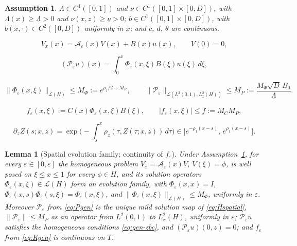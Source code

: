 \documentclass[10pt,a4paper]{amsart}
\newtheorem{assumption}{Assumption}
\newtheorem{lemma}{Lemma}
\newcommand{\Hs}{H}
\newcommand{\PP}{\mathcal P}
\newcommand{\uL}{\underline\Lambda}
\newcommand{\un}{\underline\nu}
\begin{document}
\begin{assumption}\label{as:coeff}
$\Lambda\in C^1([0,1])$ and $\nu\in C^1([0,1]\times[0,D])$, with $\Lambda(x)\ge\uL>0$ and $\nu(x,z)\ge\un>0$; $b\in C^1([0,1]\times[0,D])$, with $b(x,\cdot)\in C^2([0,D])$ uniformly in $x$; and $c$, $d$, $\theta$ are continuous.
\end{assumption}

\begin{equation}
 V_x(x)=\mathcal A_\varepsilon(x)V(x)+B(x)u(x),\qquad V(0)=0,
 \label{eq:Hspatial}
\end{equation}

\begin{equation}
 (\PP_\varepsilon u)(x)=\int_0^x\Phi_\varepsilon(x,\xi)B(\xi)u(\xi)\,d\xi ,
 \label{eq:Pgen}
\end{equation}

\begin{equation}
 \|\Phi_\varepsilon(x,\xi)\|_{\mathcal L(\Hs)}\le M_\Phi:=e^{\rho_1/2+M_R},
 \qquad
 \|\PP_\varepsilon\|_{\mathcal L(L^2(0,1),L^2_x(\Hs))}\le M_P:=\frac{M_\Phi\sqrt D\,B_0}{\uL} .
 \label{eq:Phibound}
\end{equation}

\begin{equation}
 f_\varepsilon(x,\xi):=C(x)\Phi_\varepsilon(x,\xi)B(\xi),
 \qquad
 |f_\varepsilon(x,\xi)|\le\bar f:=M_CM_P,
 \label{eq:Kgen}
\end{equation}

\begin{equation}
 \partial_z Z(s;x,z)
 =\exp\!\Big(-\!\int_s^x\rho_z(\tau,Z(\tau;x,z))\,d\tau\Big)
 \in\big[e^{-\rho_1(x-s)},\,e^{\rho_1(x-s)}\big].
 \label{eq:charJac}
\end{equation}

\begin{lemma}[Spatial evolution family; continuity of $f_\varepsilon$]\label{lem:evolution}
Under Assumption~\ref{as:coeff}, for every $\varepsilon\in[0,\bar\varepsilon]$ the homogeneous problem $V_x=\mathcal A_\varepsilon(x)V$, $V(\xi)=\phi$, is well posed on $\xi\le x\le1$ for every $\phi\in\Hs$, and its solution operators $\Phi_\varepsilon(x,\xi)\in\mathcal L(\Hs)$ form an evolution family, with $\Phi_\varepsilon(x,x)=I$, $\Phi_\varepsilon(x,s)\Phi_\varepsilon(s,\xi)=\Phi_\varepsilon(x,\xi)$, and $\|\Phi_\varepsilon(x,\xi)\|_{\mathcal L(\Hs)}\le M_\Phi$, uniformly in $\varepsilon$. Moreover $\PP_\varepsilon$ from \eqref{eq:Pgen} is the unique mild solution map of \eqref{eq:Hspatial}, $\|\PP_\varepsilon\|\le M_P$ as an operator from $L^2(0,1)$ to $L^2_x(\Hs)$, uniformly in $\varepsilon$; $\PP_\varepsilon u$ satisfies the homogeneous conditions \eqref{eq:gen-zbc}, and $(\PP_\varepsilon u)(0,z)=0$; and $f_\varepsilon$ from \eqref{eq:Kgen} is continuous on $T$.
\end{lemma}
\end{document}
